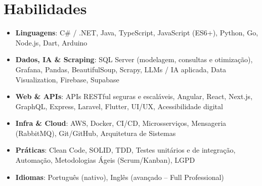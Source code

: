 \documentclass[letterpaper,11pt]{article}
\newcommand{\resumeSubHeadingListStart}{\begin{itemize}[leftmargin=*]}
\newcommand{\resumeSubHeadingListEnd}{\end{itemize}}
\begin{document}
%
\section{Habilidades}
 \resumeSubHeadingListStart
   \item{
     \textbf{Linguagens}{: C\# / .NET, Java, TypeScript, JavaScript (ES6+), Python, Go, Node.js, Dart, Arduino}
   }
   \item{
     \textbf{Dados, IA \& Scraping}{: SQL Server (modelagem, consultas e otimização), Grafana, Pandas, BeautifulSoup, Scrapy, LLMs / IA aplicada, Data Visualization, Firebase, Supabase}
   }
   \item{
     \textbf{Web \& APIs}{: APIs RESTful seguras e escaláveis, Angular, React, Next.js, GraphQL, Express, Laravel, Flutter, UI/UX, Acessibilidade digital}
   }
   \item{
     \textbf{Infra \& Cloud}{: AWS, Docker, CI/CD, Microsserviços, Mensageria (RabbitMQ), Git/GitHub, Arquitetura de Sistemas}
   }
   \item{
     \textbf{Práticas}{: Clean Code, SOLID, TDD, Testes unitários e de integração, Automação, Metodologias Ágeis (Scrum/Kanban), LGPD}
   }
   \item{
     \textbf{Idiomas}{: Português (nativo), Inglês (avançado -- Full Professional)}
   }
 \resumeSubHeadingListEnd


\end{document}
